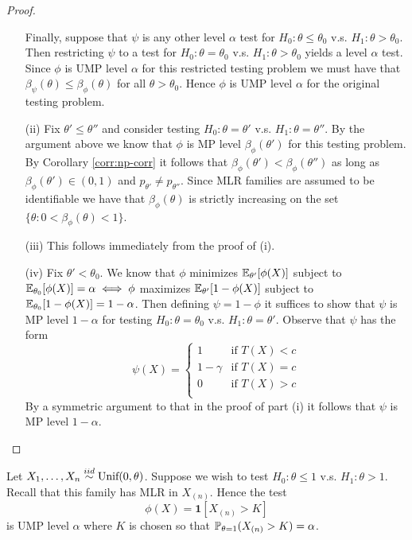 \begin{proof}
\begin{enumerate}
		Finally, suppose that $\psi$ is any other level $\alpha$ test for $H_0 : \theta \le \theta_0$ v.s. $H_1 : \theta > \theta_0$. Then restricting $\psi$ to a test for $H_0 : \theta = \theta_0$ v.s. $H_1 : \theta > \theta_0$ yields a level $\alpha$ test. Since $\phi$ is UMP level $\alpha$ for this restricted testing problem we must have that $\beta_\psi(\theta) \leq \beta_\phi(\theta)$ for all $\theta > \theta_0$. Hence $\phi$ is UMP level $\alpha$ for the original testing problem.  
		
		\item[(ii)] Fix $\theta' \leq \theta''$ and consider testing $H_0 : \theta = \theta'$ v.s. $H_1 : \theta = \theta''$. By the argument above we know that $\phi$ is MP level $\beta_{\phi}(\theta')$ for this testing problem. By Corollary \ref{corr:np-corr} it follows that $\beta_{\phi}(\theta') < \beta_{\phi}(\theta'')$ as long as $\beta_{\phi}(\theta') \in (0, 1)$ and $p_{\theta'} \neq p_{\theta''}$. Since MLR families are assumed to be identifiable we have that $\beta_\phi(\theta)$ is strictly increasing on the set $\{\theta : 0 < \beta_{\phi}(\theta) < 1\}$. 
		
		\item[(iii)] This follows immediately from the proof of (i).
		
		\item[(iv)] Fix $\theta' < \theta_0$. We know that $\phi$ minimizes $\mathbb{E}_{\theta'} [\phi(X)]$ subject to $\mathbb{E}_{\theta_0}[\phi(X)] = \alpha \iff \phi$ maximizes $\mathbb{E}_{\theta'} [1 - \phi(X)]$ subject to $\mathbb{E}_{\theta_0}[1 - \phi(X)] = 1 - \alpha$. Then defining $\psi = 1 - \phi$ it suffices to show that $\psi$ is MP level $1 - \alpha$ for testing $H_0 : \theta = \theta_0$ v.s. $H_1 : \theta = \theta'$. Observe that $\psi$ has the form \[
			\psi(X) = \begin{cases}
				1 &\text{if } T(X) < c \\
				1 - \gamma &\text{if } T(X) = c \\
				0 &\text{if } T(X) > c \\
			\end{cases}
		\] By a symmetric argument to that in the proof of part (i) it follows that $\psi$ is MP level $1 - \alpha$. 
	\end{enumerate}
\end{proof}

\begin{example}
	Let $X_1, \dots, X_n \overset{iid}{\sim} \text{Unif}(0, \theta)$. Suppose we wish to test $H_0 : \theta \leq 1$ v.s. $H_1 : \theta > 1$. Recall that this family has MLR in $X_{(n)}$. Hence the test \[
		\phi(X) = \mathbf{1}[X_{(n)} > K]
	\] is UMP level $\alpha$ where $K$ is chosen so that $\mathbb{P}_{\theta = 1}(X_{(n)} > K) = \alpha$.
\end{example}


